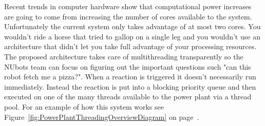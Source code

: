 \documentclass[english,12pt]{scrartcl}
\begin{document}
			Recent trends in computer hardware show that computational power increases are going
			to come from increasing the number of cores available to the system.
			Unfortunately the current system only takes advantage of at most two cores.
			You wouldn't ride a horse that tried to gallop on a single leg and you wouldn't use an architecture
			that didn't let you take full advantage of your processing resources.
			The proposed architecture takes care of multithreading transparently so the NUbots team can
			focus on figuring out the important questions such "can this robot fetch me a pizza?".
			When a reaction is triggered it doesn't necessarily run immediately.
			Instead the reaction is put into a blocking priority queue and then executed on one of the many threads
			available to the power plant via a thread pool.
			For an example of how this system works see Figure~\ref{fig:PowerPlantThreadingOverviewDiagram} on
			page~\pageref{fig:PowerPlantThreadingOverviewDiagram}.
\end{document}
